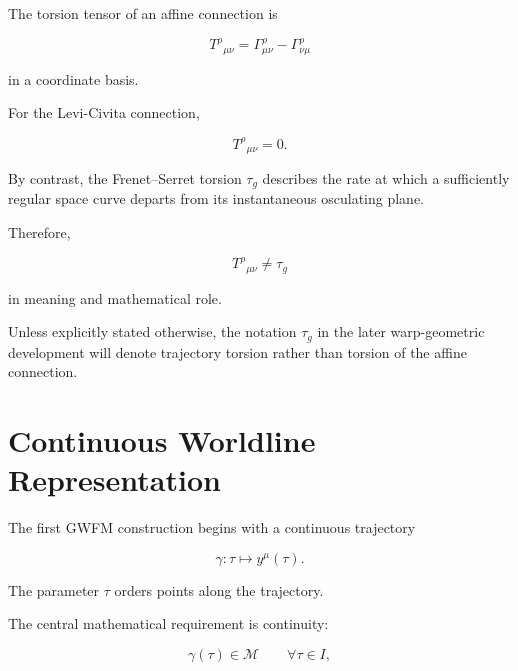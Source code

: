 \documentclass[12pt,oneside]{book}
\begin{document}
The torsion tensor of an affine connection is

\begin{equation}
    T^\rho{}_{\mu\nu}
    =
    \Gamma^\rho_{\mu\nu}
    -
    \Gamma^\rho_{\nu\mu}
\end{equation}

in a coordinate basis.

For the Levi-Civita connection,

\begin{equation}
    T^\rho{}_{\mu\nu}
    =
    0.
    \label{eq:levi-civita-zero-torsion}
\end{equation}

By contrast, the Frenet--Serret torsion \(\tau_g\) describes the
rate at which a sufficiently regular space curve departs from
its instantaneous osculating plane.

Therefore,

\begin{equation}
    \boxed{
    T^\rho{}_{\mu\nu}
    \neq
    \tau_g
    }
    \label{eq:torsion-distinction-box}
\end{equation}

in meaning and mathematical role.

Unless explicitly stated otherwise, the notation
\(\tau_g\) in the later warp-geometric development will denote
trajectory torsion rather than torsion of the affine connection.


\section{Continuous Worldline Representation}
\label{sec:continuous-worldline-entity}

The first GWFM construction begins with a continuous trajectory

\begin{equation}
    \gamma:
    \tau
    \longmapsto
    y^\mu(\tau).
    \label{eq:gwfm-worldline}
\end{equation}

The parameter \(\tau\) orders points along the trajectory.

The central mathematical requirement is continuity:

\begin{equation}
    \gamma(\tau)
    \in
    \mathcal{M}
    \qquad
    \forall \tau\in I,
\end{equation}
\end{document}
